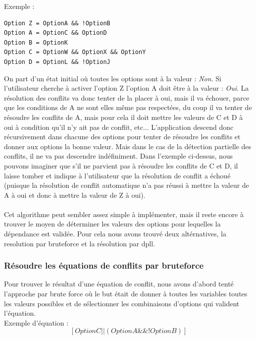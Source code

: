 \documentclass[16pts]{report}
\begin{document}
Exemple :\\
\begin{lstlisting}
Option Z = OptionA && !OptionB
Option A = OptionC && OptionD
Option B = OptionK
Option C = OptionW && OptionX && OptionY
Option D = OptionL && !OptionJ
\end{lstlisting}

On part d'un état initial où toutes les options sont à la valeur :
\textit{Non}.  Si l'utilisateur cherche à activer l'option Z l'option A doit
être à la valeur : \textit{Oui}. La résolution des conflits va donc tenter de
la placer à oui, mais il va échouer, parce que les conditions de A ne sont elles
même pas respectées, du coup il va tenter de résoudre les conflits de A, mais
pour cela il doit mettre les valeurs de C et D à oui à condition qu'il n'y ait
pas de conflit, etc...  L'application descend donc récursivement dans chacune
des options pour tenter de résoudre les conflits et donner aux options la bonne
valeur. Mais dans le cas de la détection partielle des conflits, il ne va pas
descendre indéfiniment. Dans l'exemple ci-dessus, nous pouvons imaginer que s'il ne parvient pas à résoudre les conflits de C et D, il laisse tomber et
indique à l'utilisateur que la résolution de conflit a échoué (puisque la
résolution de conflit automatique n'a pas réussi à mettre la valeur de A à oui
et donc à mettre la valeur de Z à oui).\\
\\

Cet algorithme peut sembler assez simple à implémenter, mais il reste encore
à trouver le moyen de déterminer les valeurs des options pour lequelles la
dépendance est validée. Pour cela nous avons trouvé deux altérnatives, la
resolution par bruteforce et la résolution par dpll.


            \subsubsection{Résoudre les équations de conflits par bruteforce}
            \label{sub:Résoudre les équations de conflits par bruteforce}

Pour trouver le résultat d'une équation de conflit, nous avons d'abord tenté
l'approche par brute force où le but était de donner à toutes les variables
toutes les valeurs possibles et de sélectionner les combinaisons d'options qui
valident l'équation.
\\

Exemple d'équation :
\[[OptionC || (OptionA \&\& !OptionB)]\]
\end{document}
